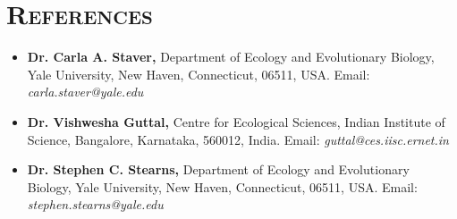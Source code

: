\documentclass[11pt,a4paper,sans]{moderncv}        %
\begin{document}


\section{\textsc{References}}
\begin{itemize}
\setlength\itemsep{2.5pt}

\item \textbf{Dr. Carla A. Staver,} Department of Ecology and Evolutionary Biology, Yale University, New Haven, Connecticut, 06511, USA. Email: \emph{carla.staver@yale.edu} 

\item \textbf{Dr. Vishwesha Guttal,} Centre for Ecological Sciences, Indian Institute of Science, Bangalore, Karnataka, 560012, India. Email: \emph{guttal@ces.iisc.ernet.in}

\item \textbf{Dr. Stephen C. Stearns,} Department of Ecology and Evolutionary Biology, Yale University, New Haven, Connecticut, 06511, USA. Email: \emph{stephen.stearns@yale.edu} 
\end{itemize}

\nocite{*}




\end{document}
